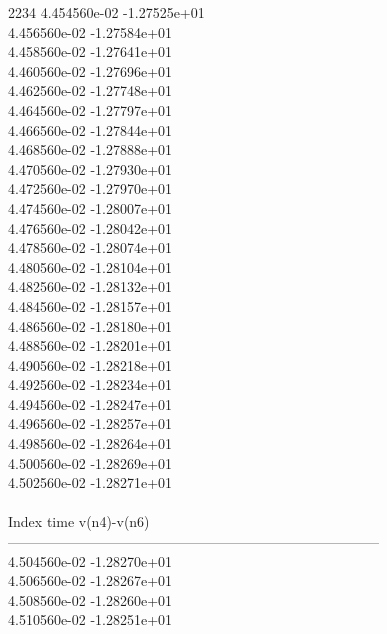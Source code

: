 2234	4.454560e-02	-1.27525e+01	\\ 	4.456560e-02	-1.27584e+01	\\ 	4.458560e-02	-1.27641e+01	\\ 	4.460560e-02	-1.27696e+01	\\ 	4.462560e-02	-1.27748e+01	\\ 	4.464560e-02	-1.27797e+01	\\ 	4.466560e-02	-1.27844e+01	\\ 	4.468560e-02	-1.27888e+01	\\ 	4.470560e-02	-1.27930e+01	\\ 	4.472560e-02	-1.27970e+01	\\ 	4.474560e-02	-1.28007e+01	\\ 	4.476560e-02	-1.28042e+01	\\ 	4.478560e-02	-1.28074e+01	\\ 	4.480560e-02	-1.28104e+01	\\ 	4.482560e-02	-1.28132e+01	\\ 	4.484560e-02	-1.28157e+01	\\ 	4.486560e-02	-1.28180e+01	\\ 	4.488560e-02	-1.28201e+01	\\ 	4.490560e-02	-1.28218e+01	\\ 	4.492560e-02	-1.28234e+01	\\ 	4.494560e-02	-1.28247e+01	\\ 	4.496560e-02	-1.28257e+01	\\ 	4.498560e-02	-1.28264e+01	\\ 	4.500560e-02	-1.28269e+01	\\ 	4.502560e-02	-1.28271e+01	\\ \hline
\\ \hline
Index   time            v(n4)-v(n6)     \\ \hline
--------------------------------------------------------------------------------\\ 	4.504560e-02	-1.28270e+01	\\ 	4.506560e-02	-1.28267e+01	\\ 	4.508560e-02	-1.28260e+01	\\ 	4.510560e-02	-1.28251e+01	\\ \hline
